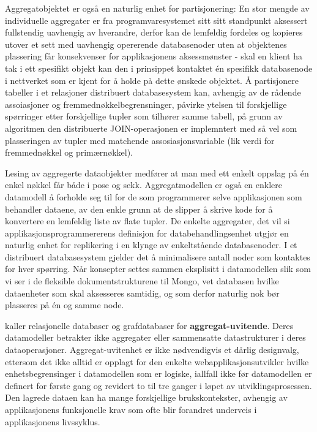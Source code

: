 Aggregatobjektet er også en naturlig enhet for partisjonering: En stor mengde av individuelle aggregater er fra programvaresystemet sitt sitt standpunkt aksessert fullstendig uavhengig av hverandre, derfor kan de lemfeldig fordeles og kopieres utover et sett med uavhengig opererende databasenoder uten at objektenes plassering får konsekvenser for applikasjonens aksessmønster - skal en klient ha tak i ett spesifikt objekt kan den i prinsippet kontaktet én spesifikk databasenode i nettverket som er kjent for å holde på dette ønskede objektet. Å partisjonere tabeller i et relasjoner distribuert databasesystem kan, avhengig av de rådende assoiasjoner og fremmednøkkelbegrensninger, påvirke ytelsen til forskjellige spørringer etter forskjellige tupler som tilhører samme tabell, på grunn av algoritmen den distribuerte JOIN-operasjonen er implemntert med så vel som plasseringen av tupler med matchende assosiasjonsvariable (lik verdi for fremmednøkkel og primærnøkkel).

Lesing av aggregerte dataobjekter medfører at man med ett enkelt oppslag på én enkel nøkkel får både i pose og sekk. Aggregatmodellen er også en enklere datamodell å forholde seg til for de som programmerer selve applikasjonen som behandler dataene, av den enkle grunn at de slipper å skrive kode for å konvertere en lemfeldig liste av flate tupler. De enkelte aggregater, det vil si applikasjonsprogrammererens definisjon for databehandlingsenhet utgjør en naturlig enhet for replikering i en klynge av enkeltstående databasenoder. I et distribuert databasesystem gjelder det å minimalisere antall noder som kontaktes for hver spørring. Når konsepter settes sammen eksplisitt i datamodellen slik som vi ser i de fleksible dokumentstrukturene til Mongo, vet databasen hvilke dataenheter som skal aksesseres samtidig, og som derfor naturlig nok bør plasseres på én og samme node.

\cite{sadalage2013} kaller relasjonelle databaser og grafdatabaser for \textbf{aggregat-uvitende}. Deres datamodeller betrakter ikke aggregater eller sammensatte datastrukturer i deres dataoperasjoner. Aggregat-uvitenhet er ikke nødvendigvis et dårlig designvalg, ettersom det ikke alltid er opplagt for den enkelte webapplikasjonsutvikler hvilke enhetsbegrensinger i datamodellen som er logiske, iallfall ikke før datamodellen er definert for første gang og revidert to til tre ganger i løpet av utviklingsprosessen. Den lagrede dataen kan ha mange forskjellige brukskontekster, avhengig av applikasjonens funksjonelle krav som ofte blir forandret underveis i applikasjonens livssyklus.

